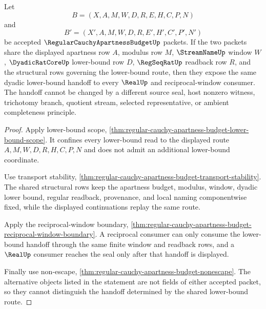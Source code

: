 \begin{theorem}
\label{thm:regular-cauchy-apartness-budget-lower-bound-determinacy}
Let
$$
B=(X,A,M,W,D,R,E,H,C,P,N)
$$
and
$$
B'=(X',A,M,W,D,R,E',H',C',P',N')
$$
be accepted $\RegularCauchyApartnessBudgetUp$ packets. If the two packets share the displayed apartness row $A$, modulus row $M$, $\StreamNameUp$ window $W$, $\DyadicRatCoreUp$ lower-bound row $D$, $\RegSeqRatUp$ readback row $R$, and the structural rows governing the lower-bound route, then they expose the same dyadic lower-bound handoff to every $\RealUp$ and reciprocal-window consumer. The handoff cannot be changed by a different source seal, host nonzero witness, trichotomy branch, quotient stream, selected representative, or ambient completeness principle.
\end{theorem}
\begin{proof}
Apply lower-bound scope, \autoref{thm:regular-cauchy-apartness-budget-lower-bound-scope}. It confines every lower-bound read to the displayed route $A,M,W,D,R,H,C,P,N$ and does not admit an additional lower-bound coordinate.

Use transport stability, \autoref{thm:regular-cauchy-apartness-budget-transport-stability}. The shared structural rows keep the apartness budget, modulus, window, dyadic lower bound, regular readback, provenance, and local naming componentwise fixed, while the displayed continuations replay the same route.

Apply the reciprocal-window boundary, \autoref{thm:regular-cauchy-apartness-budget-reciprocal-window-boundary}. A reciprocal consumer can only consume the lower-bound handoff through the same finite window and readback rows, and a $\RealUp$ consumer reaches the seal only after that handoff is displayed.

Finally use non-escape, \autoref{thm:regular-cauchy-apartness-budget-nonescape}. The alternative objects listed in the statement are not fields of either accepted packet, so they cannot distinguish the handoff determined by the shared lower-bound route.
\end{proof}

